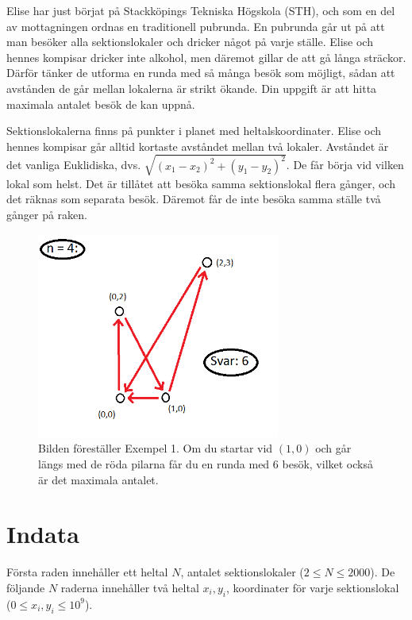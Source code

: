 \noindent

Elise har just börjat på Stackköpings Tekniska Högskola (STH), och som en del av mottagningen ordnas en traditionell pubrunda.
En pubrunda går ut på att man besöker alla sektionslokaler och dricker något på varje ställe.
Elise och hennes kompisar dricker inte alkohol, men däremot gillar de att gå långa sträckor.
Därför tänker de utforma en runda med så många besök som möjligt, sådan att avstånden de går mellan lokalerna är strikt ökande.
Din uppgift är att hitta maximala antalet besök de kan uppnå.

Sektionslokalerna finns på punkter i planet med heltalskoordinater.
Elise och hennes kompisar går alltid kortaste avståndet mellan två lokaler.
Avståndet är det vanliga Euklidiska, dvs. $\sqrt{(x_1 - x_2)^2 + (y_1 - y_2)^2}$.
De får börja vid vilken lokal som helst.
Det är tillåtet att besöka samma sektionslokal flera gånger, och det räknas som separata besök.
Däremot får de inte besöka samma ställe två gånger på raken.

\begin{figure}[!h]
\begin{center}
\includegraphics[width=8cm]{pubsequence.png}
\end{center}
\caption{Bilden föreställer Exempel 1. Om du startar vid $(1,0)$ och går längs med de röda pilarna får du en runda med $6$ besök, vilket också är det maximala antalet.}
\end{figure}

\section*{Indata}
Första raden innehåller ett heltal $N$, antalet sektionslokaler ($2 \leq N \leq 2000$).
De följande $N$ raderna innehåller två heltal $x_i, y_i$, koordinater för varje sektionslokal ($0 \leq x_i, y_i \leq 10^9$).

